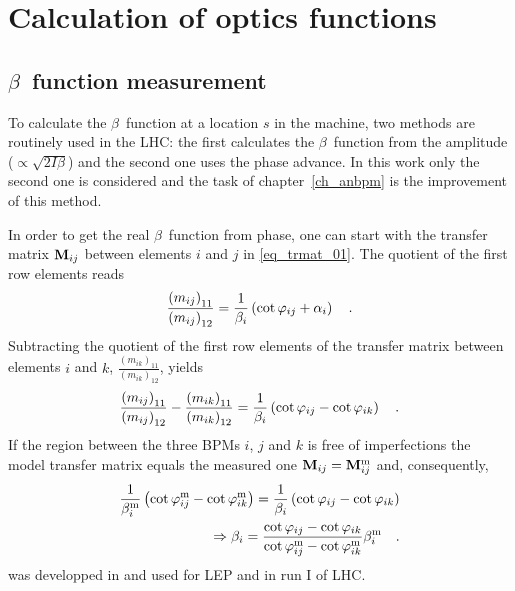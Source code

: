 
\section{Calculation of optics functions}

\subsection{\texorpdfstring{$\beta$}{beta}~function measurement}
\label{sec_beta_meas}

To calculate the $\beta$~function at a location $s$ in the machine, two methods are routinely used
in the LHC: the first calculates the $\beta$~function from the amplitude ($\propto \sqrt{2I\beta}$)
and the second one uses the phase advance.
In this work only the second one is considered and the task of chapter~\ref{ch_anbpm} is the improvement
of this method.

In order to get the real $\beta$~function from phase, one can start with the transfer matrix $\mathbf{M}_{ij}$
between elements $i$ and $j$ in \eqref{eq_trmat_01}.
The quotient of the first row elements reads 
%
\begin{equation}
    \frac{\left(m_{ij}\right)_{11}}{\left(m_{ij}\right)_{12}} =
    \frac{1}{\beta_i} \left(\cot\varphi_{ij} + \alpha_i\right)
    \quad .
    \label{eq_trmat_quot}
\end{equation}
%
Subtracting the quotient of the first row elements of the transfer matrix between elements $i$ and $k$,
$ \frac{\left(m_{ik}\right)_{11}}{\left(m_{ik}\right)_{12}}$, yields
%
\begin{equation}
    \frac{\left(m_{ij}\right)_{11}}{\left(m_{ij}\right)_{12}} - \frac{\left(m_{ik}\right)_{11}}{\left(m_{ik}\right)_{12}}
    =
    \frac{1}{\beta_i} \left( \cot\varphi_{ij} - \cot\varphi_{ik}\right)
    \quad .
\end{equation}
%
If the region between the three BPMs $i$, $j$ and $k$ is free of imperfections
the model transfer matrix equals the measured one
$\mathbf{M}_{ij} = \mathbf{M}_{ij}^\text{m}$ and, consequently,
%
\begin{align}
    \frac{1}{\beta_i^\text{m}} \left( \cot\varphi_{ij}^\text{m} - \cot \varphi_{ik}^\text{m} \right)
    =
    \frac{1}{\beta_i} \left( \cot\varphi_{ij} - \cot \varphi_{ik} \right) \notag \\
    \Rightarrow
    \beta_i = \frac{
        \cot\varphi_{ij} - \cot\varphi_{ik}
    }{
        \cot\varphi_{ij}^\text{m} - \cot\varphi_{ik}^\text{m}
    }
    \beta_i^\text{m}
    \quad .
    \label{eq_3bpm_method}
\end{align}
%
 was developped in \cite{Castro1996} and used for LEP and in run I of LHC.

